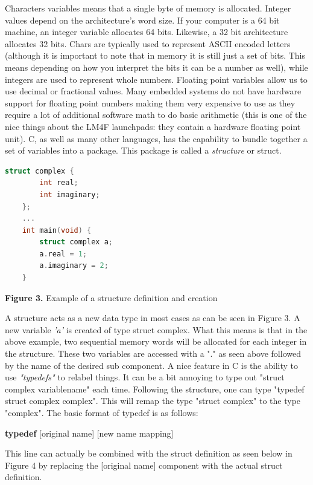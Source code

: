 \documentclass[paper=a4, fontsize=11pt]{scrartcl}
\numberwithin{equation}{section}		%
\numberwithin{figure}{section}			%
\numberwithin{table}{section}			%
\begin{document}
Characters variables means that a single byte of memory is allocated. Integer values depend on the architecture's word size. If your computer is a 64 bit machine, an integer variable allocates 64 bits. Likewise, a 32 bit architecture allocates 32 bits. Chars are typically used to represent ASCII encoded letters (although it is important to note that in memory it is still just a set of bits. This means depending on how you interpret the bits it can be a number as well), while integers are used to represent whole numbers. Floating point variables allow us to use decimal or fractional values. Many embedded systems do not have hardware support for floating point numbers making them very expensive to use as they require a lot of additional software math to do basic arithmetic (this is one of the nice things about the LM4F launchpads: they contain a hardware floating point unit). C, as well as many other languages, has the capability to bundle together a set of variables into a package. This package is called a \textit{structure} or struct. 
\begin{framed}
	\begin{lstlisting}[language=C++,
	                   directivestyle={\color{black}}
        	            emph={int,char,double,float,unsigned},
                	     emphstyle={\color{blue}}
                	    ]
	struct complex {
		int real;
		int imaginary;
	};
	...
	int main(void) {
		struct complex a;
		a.real = 1;
		a.imaginary = 2;
	}
	\end{lstlisting}
\end{framed}
\vskip 0.1in
\centerline{\textbf{Figure 3. }Example of a structure definition and creation}
\vskip 0.1in

A structure acts as a new data type in most cases as can be seen in Figure 3. A new variable \textit{'a'} is created of type struct complex. What this means is that in the above example, two sequential memory words will be allocated for each integer in the structure. These two variables are accessed with a "." as seen above followed by the name of the desired sub component. A nice feature in C is the ability to use \textit{"typedefs"} to relabel things. It can be a bit annoying to type out "struct complex variablename" each time. Following the structure, one can type "typedef struct complex complex". This will remap the type "struct complex" to the type "complex". The basic format of typedef is as follows: 
\centerline{\textbf{typedef} [original name] [new name mapping]} 
This line can actually be combined with the struct definition as seen below in Figure 4 by replacing the [original name] component with the actual struct definition.\\
\end{document}

